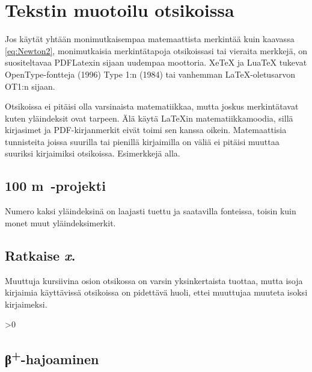 \documentclass[globalnumbering,centeredcaptions,draftfooter]{tutthesis/tutthesis} %
\begin{document}
\section{Tekstin muotoilu otsikoissa}

Jos käytät yhtään monimutkaisempaa matemaattista merkintää kuin kaavassa \eqref{eq:Newton2}, monimutkaisia merkintätapoja otsikoissasi tai vieraita merkkejä, on suositeltavaa PDFLatexin sijaan uudempaa moottoria.
XeTeX ja LuaTeX tukevat OpenType-fontteja (1996) Type 1:n (1984) tai vanhemman LaTeX-oletusarvon OT1:n sijaan.

Otsikoissa ei pitäisi olla varsinaista matematiikkaa, mutta joskus merkintätavat kuten yläindeksit ovat tarpeen.
Älä käytä LaTeXin matematiikkamoodia, sillä kirjasimet ja PDF-kirjanmerkit eivät toimi sen kanssa oikein.
Matemaattisia tunnisteita joissa suurilla tai pienillä kirjaimilla on väliä ei pitäisi muuttaa suuriksi kirjaimiksi otsikoissa.
Esimerkkejä alla.

\subsection{100 m\texttwosuperior\ -projekti}

Numero kaksi yläindeksinä on laajasti tuettu ja saatavilla fonteissa, toisin kuin monet muut yläindeksimerkit.

\newcommand*{\varx}{x}
\subsection{Ratkaise \textit{\protect\varx}.} %

Muuttuja kursiivina osion otsikossa on varsin yksinkertaista tuottaa, mutta isoja kirjaimia käyttävissä otsikoissa on pidettävä huoli, ettei muuttujaa muuteta isoksi kirjaimeksi.

\newcommand*{\plussuperior}{\textsuperscript{+}}

\fi{}\fi>0
  \newcommand*{\tbeta}{β}
  \subsection{\protect\tbeta\plussuperior-hajoaminen} %
\else\ifx\textgreekfontmap\undefined\else
\end{document}
